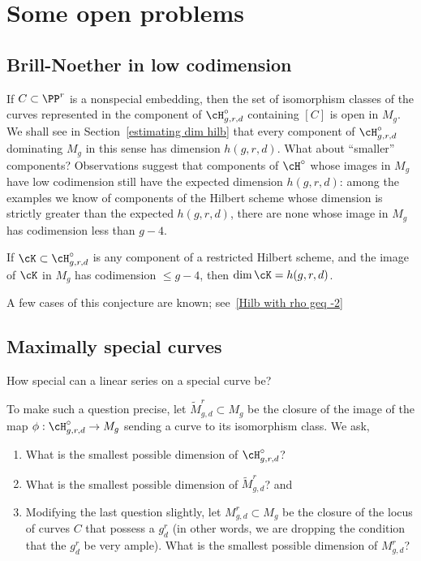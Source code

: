 \section{Some open problems}\label{open problems}

\subsection{Brill-Noether in low codimension}
 
If $C\subset \PP^r$ is a nonspecial embedding, then the set of isomorphism classes of the curves represented
in the component of $\cH^\circ_{g,r,d}$ containing $[C]$ is open in $M_g$. We shall see in Section~\ref{estimating dim hilb} that every component of $\cH^\circ_{g,r,d}$  dominating $M_g$ in this sense has dimension $h(g,r,d)$. 
What about ``smaller'' components?
Observations suggest that components of $\cH^\circ$ whose images in $M_g$ have low codimension still have the expected dimension $h(g,r,d)$: among the examples we know of components of the Hilbert scheme whose dimension is strictly greater than the expected $h(g,r,d)$, there are none whose image in $M_g$ has codimension less than $g-4$. 

\begin{conjecture}\label{large rho hilb dimension}
If $\cK \subset \cH^\circ_{g,r,d}$ is any component of a restricted Hilbert scheme, and the image of $\cK$ in $M_g$ has codimension $\leq g-4$, then $\dim \cK = h(g,r,d)$.
\end{conjecture}

A few cases of this conjecture are known; see~\ref{Hilb with rho geq -2}

\subsection{Maximally special  curves} 
How special can a linear series on a special curve be?

To make such a question precise, let $\widetilde M^r_{g,d} \subset M_g$ be the closure of the image of the map $\phi : \cH^\circ_{g,r,d}\to M_g$ sending a curve to its isomorphism class. We ask,
\begin{enumerate}
\item What is the smallest possible dimension of $\cH^\circ_{g,r,d}$? 
\item What is the smallest possible dimension of $\widetilde M^r_{g,d}$? and
\item Modifying the last question slightly, let $M^r_{g,d} \subset M_g$ be the closure of the locus of curves $C$ that possess a $g^r_d$ (in other words, we are dropping the condition that the $g^r_d$ be very ample). What is the smallest possible dimension of $M^r_{g,d}$?
\end{enumerate}

